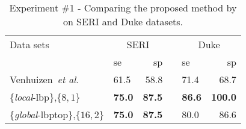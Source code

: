 
\begin{table}[h]
\caption{Experiment \#1 - Comparing the proposed method by \cite{Venhuizen2015} on SERI and Duke datasets.}%
\centering
\scriptsize{
\begin{tabular}{l	lr c lr}
\toprule
Data sets 	& \multicolumn{2}{c}{SERI} & & \multicolumn{2}{c}{Duke} \\
  \cmidrule(l){2-3}  \cmidrule(l){5-6}
	         & \ac{se} & \ac{sp} & & \ac{se} & \ac{sp}\\
\midrule
Venhuizen~\textit{et al.} \cite{Venhuizen2015} 		& 61.5 & 58.8 & & 71.4 & 68.7\\
\{\emph{local}-\ac{lbp}\},$\{8,1\}$				   & \textbf{75.0} & \textbf{87.5} & & \textbf{86.6} & \textbf{100.0}   \\
\{\emph{global}-\ac{lbptop}\},$\{16,2\}$				& \textbf{75.0} & \textbf{87.5} & & 80.0 & 86.6  \\


\bottomrule
\end{tabular}}
\label{tab:table1-2}
\end{table}
